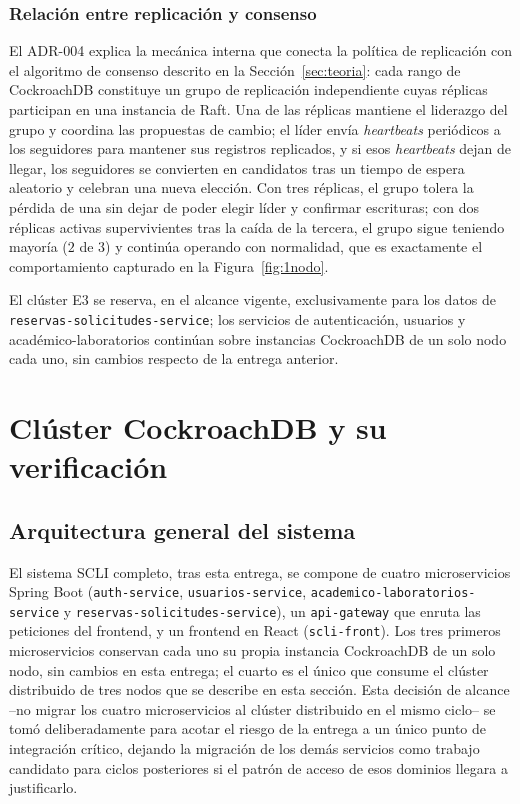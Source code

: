 \documentclass[10pt,twocolumn]{article}
\begin{document}
\subsubsection{Relación entre replicación y consenso}

El ADR-004 explica la mecánica interna que conecta la política de
replicación con el algoritmo de consenso descrito en la
Sección~\ref{sec:teoria}: cada rango de CockroachDB constituye un grupo de
replicación independiente cuyas réplicas participan en una instancia de
Raft. Una de las réplicas mantiene el liderazgo del grupo y coordina las
propuestas de cambio; el líder envía \emph{heartbeats} periódicos a los
seguidores para mantener sus registros replicados, y si esos
\emph{heartbeats} dejan de llegar, los seguidores se convierten en
candidatos tras un tiempo de espera aleatorio y celebran una nueva
elección. Con tres réplicas, el grupo tolera la pérdida de una sin dejar de
poder elegir líder y confirmar escrituras; con dos réplicas activas
supervivientes tras la caída de la tercera, el grupo sigue teniendo mayoría
($2$ de $3$) y continúa operando con normalidad, que es exactamente el
comportamiento capturado en la Figura~\ref{fig:1nodo}.

El clúster E3
se reserva, en el alcance vigente, exclusivamente para los datos de
\texttt{reservas-solicitudes-service}; los servicios de autenticación,
usuarios y académico-laboratorios continúan sobre instancias CockroachDB de
un solo nodo cada uno, sin cambios respecto de la entrega anterior.

\section{Clúster CockroachDB y su verificación}
\label{sec:cluster}

\subsection{Arquitectura general del sistema}

El sistema SCLI completo, tras esta entrega, se compone de cuatro
microservicios Spring Boot (\texttt{auth-service},
\texttt{usuarios-service}, \texttt{academico-laboratorios-service} y
\texttt{reservas-solicitudes-service}), un \texttt{api-gateway} que
enruta las peticiones del frontend, y un frontend en React
(\texttt{scli-front}). Los tres primeros microservicios conservan cada
uno su propia instancia CockroachDB de un solo nodo, sin cambios en esta
entrega; el cuarto es el único que consume el clúster distribuido de tres
nodos que se describe en esta sección. Esta decisión de alcance --no migrar
los cuatro microservicios al clúster distribuido en el mismo ciclo-- se
tomó deliberadamente para acotar el riesgo de la entrega a un único punto
de integración crítico, dejando la migración de los demás servicios como
trabajo candidato para ciclos posteriores si el patrón de acceso de esos
dominios llegara a justificarlo.
\end{document}
